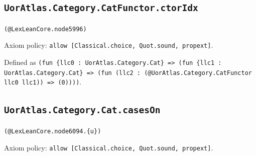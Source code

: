 \documentclass[11pt]{article}
\begin{document}
\subsection*{\texttt{UorAtlas.Category.CatFunctor.ctorIdx}}
\noindent\texttt{(@LexLeanCore.node5996)}\par
\noindent Axiom policy: \texttt{allow [Classical.choice, Quot.sound, propext]}.\par
\noindent Defined as \texttt{(fun \{llc0 : UorAtlas.Category.Cat\} => (fun \{llc1 : UorAtlas.Category.Cat\} => (fun (llc2 : (@UorAtlas.Category.CatFunctor llc0 llc1)) => (0))))}.\par
\subsection*{\texttt{UorAtlas.Category.Cat.casesOn}}
\noindent\texttt{(@LexLeanCore.node6094.\{u\})}\par
\noindent Axiom policy: \texttt{allow [Classical.choice, Quot.sound, propext]}.\par
\end{document}
